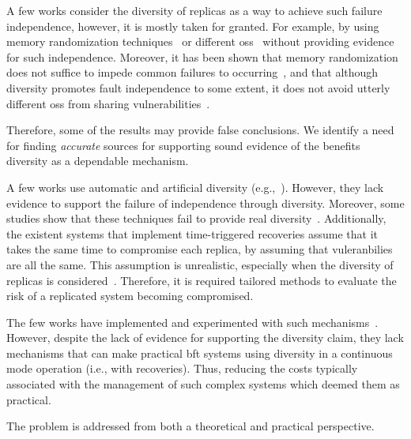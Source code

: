 A few works consider the diversity of replicas as a way to achieve such failure independence, however, it is mostly taken for granted.
For example, by using memory randomization techniques~\cite{Roeder:2010} or different \glspl{os}~\cite{Rodrigues:2001,Junqueira:2005} without providing evidence for such independence. 
Moreover, it has been shown that memory randomization does not suffice to impede common failures to occurring~\cite{Snow:2013,Bittau:2014}, and that although diversity promotes fault independence to some extent, it does not avoid utterly different \glspl{os} from sharing vulnerabilities~\cite{Garcia:2014}.


Therefore, some of the results may provide false conclusions.
We identify a need for finding \emph{accurate} sources for supporting sound evidence of the benefits diversity as a dependable mechanism.

A few works use automatic and artificial diversity (e.g.,~\cite{Roeder:2010,Amir:2011}). 
However, they lack evidence to support the failure of independence through diversity. 
Moreover, some studies show that these techniques fail to provide real diversity~\cite{Snow:2013,Bittau:2014}. 
Additionally, the existent systems that implement time-triggered recoveries assume that it takes the same time to compromise each replica, by assuming that vuleranbilies are all the same. 
This assumption is unrealistic, especially when the diversity of replicas is considered~\cite{Nayak:2014}. 
Therefore, it is required tailored methods to evaluate the risk of a replicated system becoming compromised.


The few works have implemented and experimented with such mechanisms~\cite{Rodrigues:2001,Roeder:2010,Amir:2011}. 
However, despite the lack of evidence for supporting the diversity claim, they lack mechanisms that can make practical \gls{bft} systems using diversity in a continuous mode operation (i.e., with recoveries).  
Thus, reducing the costs typically associated with the management of such complex systems which deemed them as practical.


The problem is addressed from both a theoretical and practical perspective.


